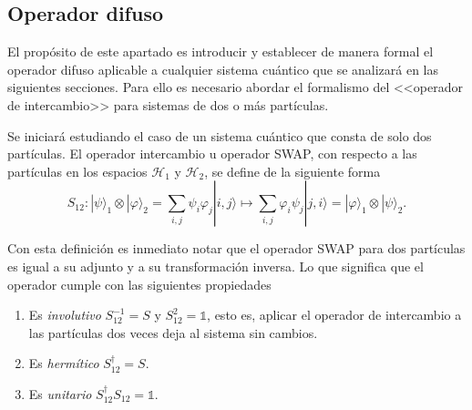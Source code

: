 \subsection{Operador difuso} %

El propósito de este apartado es introducir y establecer de manera formal el operador difuso aplicable a cualquier sistema cuántico que se analizará en las siguientes secciones. Para ello es necesario abordar el formalismo del <<operador de intercambio>> para sistemas de dos o más partículas.



Se iniciará estudiando el caso de un sistema cuántico que consta de solo dos partículas. El operador intercambio u operador SWAP, con respecto a las partículas en los espacios $\mathcal{H}_1$ y $\mathcal{H}_2$, se define de la siguiente forma\begin{equation}\label{swap}
S_{12}: |\psi\rangle_{1}\otimes |\varphi \rangle_{2}=\sum_{i,j}\psi_i\varphi_j|i,j\rangle \longmapsto     \sum_{i,j}\varphi_i\psi_j|j,i\rangle= |\varphi\rangle_{1}\otimes |\psi \rangle_{2}.
\end{equation} 

Con esta definición es inmediato notar que el operador SWAP para dos partículas es igual a su adjunto y a su transformación inversa. Lo que significa que el operador cumple con las siguientes propiedades\begin{enumerate}
    \item Es \textit{involutivo}   $S_{12}^{-1}={S}$ y ${S}_{12}^{2}=\mathds{1}$, esto es,  aplicar el operador de intercambio a las partículas dos veces deja al sistema sin cambios.
    \item Es \textit{hermítico} $ {S}_{12}^{\dagger}={S}$.
    \item Es \textit{unitario} $ {S}_{12}^{\dagger}{S}_{12}=\mathds{1}$.
\end{enumerate} 

